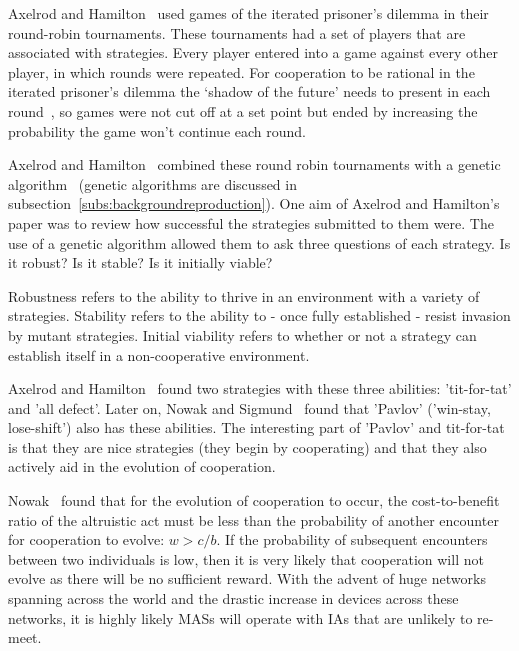 \documentclass[]{final_report}
\begin{document}
Axelrod and Hamilton~\cite{evolution_of_cooperation} used games of the iterated prisoner's dilemma in their round-robin tournaments. These tournaments had a set of players that are associated with strategies. Every player entered into a game against every other player, in which rounds were repeated. For cooperation to be rational in the iterated prisoner's dilemma the `shadow of the future' needs to present in each round~\cite{wooldridge2009introduction}, so games were not cut off at a set point but ended by increasing the probability the game won't continue each round.\par 
Axelrod and Hamilton~\cite{evolution_of_cooperation} combined these round robin tournaments with a genetic algorithm~\cite{mitchell1998introduction} (genetic algorithms are discussed in subsection~\ref{subs:backgroundreproduction}). One aim of Axelrod and Hamilton's~\cite{evolution_of_cooperation} paper was to review how successful the strategies submitted to them were. The use of a genetic algorithm allowed them to ask three questions of each strategy. Is it robust? Is it stable? Is it initially viable?\par
Robustness refers to the ability to thrive in an environment with a variety of strategies. Stability refers to the ability to - once fully established - resist invasion by mutant strategies. Initial viability refers to whether or not a strategy can establish itself in a non-cooperative environment.\par
Axelrod and Hamilton~\cite{evolution_of_cooperation} found two strategies with these three abilities: 'tit-for-tat' and 'all defect'. Later on, Nowak and Sigmund~\cite{nowak-1993a} found that 'Pavlov' ('win-stay, lose-shift') also has these abilities. The interesting part of 'Pavlov' and tit-for-tat is that they are nice strategies (they begin by cooperating) and that they also actively aid in the evolution of cooperation.\par
Nowak~\cite{five_rules_coop} found that for the evolution of cooperation to occur, the cost-to-benefit ratio of the altruistic act must be less than the probability of another encounter for cooperation to evolve: $w>c/b$. If the probability of subsequent encounters between two individuals is low, then it is very likely that cooperation will not evolve as there will be no sufficient reward. With the advent of huge networks spanning across the world and the drastic increase in devices across these networks, it is highly likely MASs will operate with IAs that are unlikely to re-meet.\par
\end{document}
